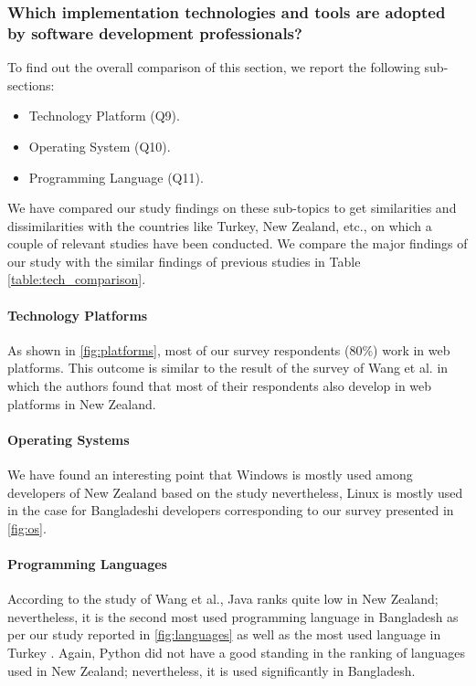 \subsubsection{Which implementation technologies and tools are adopted by software development professionals?}

To find out the overall comparison of this section, we report the following sub-sections:
\begin{itemize}
\item Technology Platform (Q9).
\item Operating System (Q10).
\item Programming Language (Q11).
\end{itemize}

We have compared our study findings on these sub-topics to get similarities and dissimilarities with the countries like Turkey, New Zealand, etc., on which a couple of relevant studies have been conducted. We compare the major findings of our study with the similar findings of previous studies in Table \ref{table:tech_comparison}.



\paragraph{Technology Platforms}
As shown in \ref{fig:platforms}, most of our survey respondents (80\%) work in web platforms. This outcome is similar to the result of the survey of Wang et al. \citep{Wang2018} in which the authors found that most of their respondents also develop in web platforms in New Zealand.


\paragraph{Operating Systems}
We have found an interesting point that Windows is mostly used among developers of New Zealand based on the study \citep{Wang2018} nevertheless, Linux is mostly used in the case for Bangladeshi developers corresponding to our survey presented in \ref{fig:os}.


\paragraph{Programming Languages}
According to the study of Wang et al.\citep{Wang2018}, Java ranks quite low in New Zealand; nevertheless, it is the second most used programming language in Bangladesh as per our study reported in \ref{fig:languages} as well as the most used language in Turkey \citep{Garousi2015}. Again, Python did not have a good standing in the ranking of languages used in New Zealand; nevertheless, it is used significantly in Bangladesh.